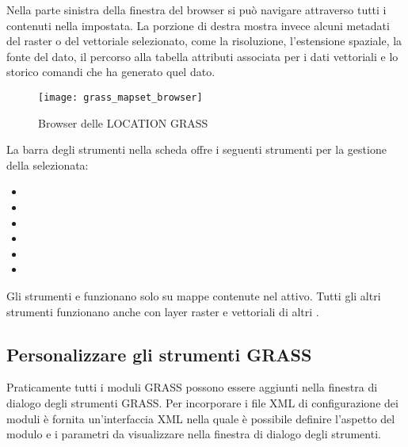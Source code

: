 Nella parte sinistra della finestra del browser si può navigare attraverso
tutti i  contenuti nella  impostata. La
porzione di destra mostra invece alcuni metadati del raster o del vettoriale
selezionato, come la risoluzione, l'estensione spaziale, la fonte del dato, il
percorso alla tabella attributi associata per i dati vettoriali e lo storico
comandi che ha generato quel dato.

\begin{figure}[h]
 \centering
 \texttt{[image: grass\_mapset\_browser]}
 \caption{Browser delle LOCATION GRASS \nixcaption}\label{fig:grass_mapset_browser}
\end{figure}

La barra degli strumenti nella scheda  offre i seguenti
strumenti per la gestione della  selezionata:

\begin{itemize}[label=--]
\item {}
\item {}
\item {}
\item {}
\item {}
\item {}
\end{itemize}

Gli strumenti  e
 funzionano solo su
mappe contenute nel  attivo. Tutti gli altri strumenti
funzionano anche con layer raster e vettoriali di altri .

\subsection{Personalizzare gli strumenti GRASS} 
\label{sec:toolbox-customizing}

Praticamente tutti i moduli GRASS possono essere aggiunti nella finestra di 
dialogo degli strumenti GRASS.
Per incorporare i file XML di configurazione dei moduli è fornita
un'interfaccia XML nella quale è possibile definire l'aspetto del modulo 
e i parametri da visualizzare nella finestra di dialogo degli strumenti.

